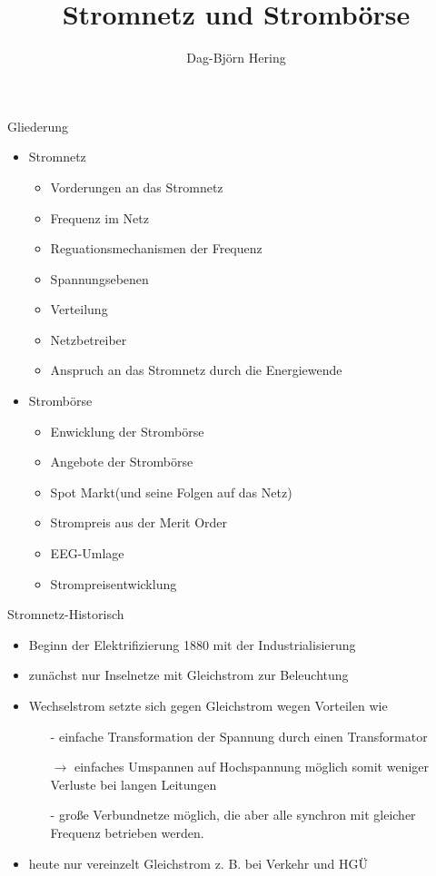 \documentclass[aspectratio=1610, professionalfonts, 9pt]{beamer}
\title{Stromnetz und Strombörse}
\author[D.~Hering]{Dag-Björn Hering}
\begin{document}
\maketitle
\begin{frame}
\end{frame}

\begin{frame}{Gliederung}
\begin{itemize}
  \item Stromnetz
  \begin{itemize}
  \item Vorderungen an das Stromnetz
  \item Frequenz im Netz
  \item Reguationsmechanismen der Frequenz
  \item Spannungsebenen
  \item Verteilung
  \item Netzbetreiber
  \item Anspruch an das Stromnetz durch die Energiewende
  \end{itemize}
\end{itemize}
\end{frame}
\begin{frame}
\begin{itemize}
 \item Strombörse
\begin{itemize}
  \item Enwicklung der Strombörse
  \item Angebote der Strombörse
  \item Spot Markt(und seine Folgen auf das Netz)
  \item Strompreis aus der Merit Order
  \item EEG-Umlage
  \item Strompreisentwicklung
\end{itemize}
\end{itemize}
\end{frame}


\begin{frame}{Stromnetz-Historisch}
\begin{itemize}
  \item Beginn der Elektrifizierung 1880 mit der Industrialisierung
  \item zunächst nur Inselnetze mit Gleichstrom zur Beleuchtung
  \item Wechselstrom setzte sich gegen Gleichstrom wegen Vorteilen wie
  \begin{itemize}
    \item[-] einfache Transformation der Spannung durch einen Transformator
    \item[$\rightarrow$] einfaches Umspannen auf Hochspannung möglich
    somit weniger Verluste bei langen Leitungen
    \item[-] große Verbundnetze möglich, die aber alle synchron mit gleicher Frequenz betrieben werden.
  \end{itemize}
  \item heute nur vereinzelt Gleichstrom z. B. bei Verkehr und HGÜ
\end{itemize}
\end{frame}
\end{document}
